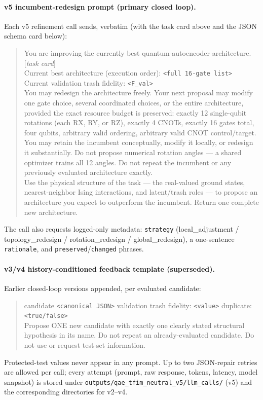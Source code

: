 \documentclass[11pt]{article}
\begin{document}
\paragraph{v5 incumbent-redesign prompt (primary closed loop).}
Each v5 refinement call sends, verbatim (with the task card above and the JSON schema card below):
\begin{quote}\small
You are improving the currently best quantum-autoencoder architecture. [\emph{task card}]\\
Current best architecture (execution order): \texttt{<full 16-gate list>}\\
Current validation trash fidelity: \texttt{<F\_val>}\\
You may redesign the architecture freely. Your next proposal may modify one gate choice, several coordinated choices, or the entire architecture, provided the exact resource budget is preserved: exactly 12 single-qubit rotations (each RX, RY, or RZ), exactly 4 CNOTs, exactly 16 gates total, four qubits, arbitrary valid ordering, arbitrary valid CNOT control/target. You may retain the incumbent conceptually, modify it locally, or redesign it substantially. Do not propose numerical rotation angles --- a shared optimizer trains all 12 angles. Do not repeat the incumbent or any previously evaluated architecture exactly.\\
Use the physical structure of the task --- the real-valued ground states, nearest-neighbor Ising interactions, and latent/trash roles --- to propose an architecture you expect to outperform the incumbent. Return one complete new architecture.
\end{quote}
The call also requests logged-only metadata: \texttt{strategy} (local\_adjustment / topology\_redesign / rotation\_redesign / global\_redesign), a one-sentence \texttt{rationale}, and \texttt{preserved}/\texttt{changed} phrases.

\paragraph{v3/v4 history-conditioned feedback template (superseded).}
Earlier closed-loop versions appended, per evaluated candidate:
\begin{quote}\small
candidate \texttt{<canonical JSON>} validation trash fidelity: \texttt{<value>} duplicate: \texttt{<true/false>}\\
Propose ONE new candidate with exactly one clearly stated structural hypothesis in its name. Do not repeat an already-evaluated candidate. Do not use or request test-set information.
\end{quote}
Protected-test values never appear in any prompt.
Up to two JSON-repair retries are allowed per call; every attempt (prompt, raw response, tokens, latency, model snapshot) is stored under \texttt{outputs/qae\_tfim\_neutral\_v5/llm\_calls/} (v5) and the corresponding directories for v2--v4.

\printbibliography
\end{document}
